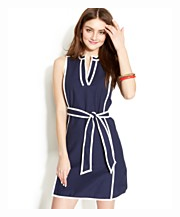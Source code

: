 \documentclass[11pt]{article}
\begin{document}
\begin{figure}
\begin{subfigure}{.18\textwidth}
\label{fig:sub2}
\end{subfigure}
\begin{subfigure}{.18\textwidth}
\centering
\includegraphics[width=\linewidth]{concepts/concept2_pos4.jpg}
\label{fig:sub2}
\end{subfigure}
\begin{subfigure}{.18\textwidth}
\centering

\end{subfigure}
\end{figure}
\end{document}
